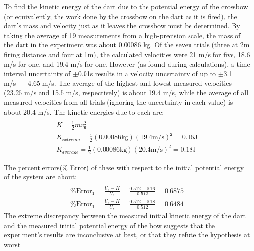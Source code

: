 \documentclass[reprint,amsmath,amssymb,aps,twoside]{revtex4-2}
\begin{document}
To find the kinetic energy of the dart due to the potential energy of the crossbow (or equivalently, the work done by the crossbow on the dart as it is fired), the dart’s mass and velocity just as it leaves the crossbow must be determined. By taking the average of 19 measurements from a high-precision scale, the mass of the dart in the experiment was about 0.00086 kg. Of the seven trials (three at 2m firing distance and four at 1m), the calculated velocities were 21 m/s for five, 18.6 m/s for one, and 19.4 m/s for one. However (as found during calculations), a time interval uncertainty of $\pm$0.01s results in a velocity uncertainty of up to $\pm$3.1 m/s―$\pm$4.65 m/s. The average of the highest and lowest measured velocities (23.25 m/s and 15.5 m/s, respectively) is about 19.4 m/s, while the average of all measured velocities from all trials (ignoring the uncertainty in each value) is about 20.4 m/s. The kinetic energies due to each are:
\begin{gather*}
	\\K = \frac{1}{2}mv_0^2
	\\ K_{extrema} = \frac{1}{2}(0.00086\text{kg})(19.4\text{m/s})^2=0.16\text{J}
	\\ K_{average} = \frac{1}{2}(0.00086\text{kg})(20.4\text{m/s})^2=0.18 \text{J}
\end{gather*}

The percent errors(\% Error) of these with respect to the initial potential energy of the system are about:
\vspace{-5pt}
\begin{gather*}
	\\ \text{\% Error}_1 = \frac{U_s-K}{U_s} = \frac{0.512-0.16}{0.512} = 0.6875
	\\ \text{\% Error}_1 = \frac{U_s-K}{U_s} = \frac{0.512-0.18}{0.512} = 0.6484
\end{gather*}
The extreme discrepancy between the measured initial kinetic energy of the dart and the measured initial potential energy of the bow suggests that the experiment’s results are inconclusive at best, or that they refute the hypothesis at worst.
\end{document}
